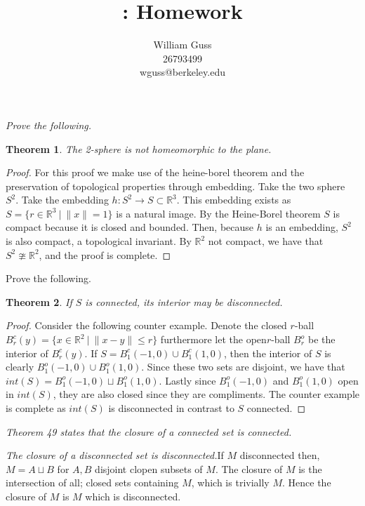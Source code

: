 \documentclass[letter]{article}
\title{\bCLASS: Homework \bHWN}
\author{William Guss\\26793499\\wguss@berkeley.edu}
\newtheorem{theorem}{Theorem}
\newenvironment{menumerate}{%
  \edef\backupindent{\the\parindent}%
  \enumerate%
  \setlength{\parindent}{\backupindent}%
}{\endenumerate}
\begin{document}
\maketitle
\thispagestyle{empty}


\setcounter{section}{2}
\begin{menumerate}
	\setcounter{enumi}{55}
	\item \emph{Prove the following.}
		\begin{theorem}
			The 2-sphere is not homeomorphic to the plane.
		\end{theorem}
		\begin{proof}
			For this proof we make use of the heine-borel theorem and the preservation of topological properties through embedding. Take the two sphere $S^2.$ Take the embedding $h: S^2 \to S \subset \mathbb{R}^3.$ This embedding exists as $S = \{r \in \mathbb{R}^3 \ | \ \|x\| = 1\}$ is a natural image. By the Heine-Borel theorem $S$ is compact because it is closed and bounded. Then, because $h$ is an embedding, $S^2$ is also compact, a topological invariant. By $\mathbb{R}^2$ not compact, we have that $S^2 \ncong \mathbb{R}^2$, and the proof is complete.
		\end{proof}
	\setcounter{enumi}{56}
	\item Prove the following.
		\begin{theorem}
			If $S$ is connected, its interior may be disconnected.
		\end{theorem}
		\begin{proof}
			Consider the following counter example. Denote the closed $r$-ball $B^c_r(y) = \{x \in \mathbb{R}^2\ |\ \|x-y\| \leq r\}$ furthermore let the open$r$-ball $B^o_r$ be the interior of $B^c_r(y).$ If $S = B^c_1(-1,0) \cup B^c_1(1,0)$, then the interior of $S$ is clearly $B^o_1(-1,0) \cup B^o_1(1,0).$ Since these two sets are disjoint, we have that $int(S) =B^o_1(-1,0) \sqcup B^o_1(1,0).$ Lastly since $B^o_1(-1,0)$ and $B^o_1(1,0)$ open in $int(S)$, they are also closed since they are compliments. The counter example is complete as $int(S)$ is disconnected in contrast to $S$ connected.
		\end{proof}
	\item \emph{Theorem 49 states that the closure of a connected set is connected.}
		\begin{menumerate}
		\item \emph{The closure of a disconnected set is disconnected.}If $M$ disconnected then, $M = A \sqcup B$ for $A,B$ disjoint clopen subsets of $M.$ The closure of $M$ is the intersection of all; closed sets containing $M$, which is trivially $M.$ Hence the closure of $M$ is $M$ which is disconnected.

\end{menumerate}
\end{menumerate}
\end{document}
